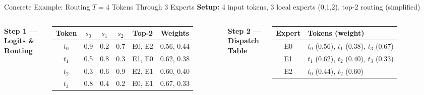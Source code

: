 \begin{frame}{Concrete Example: Routing $T=4$ Tokens Through 3 Experts}
\small
\textbf{Setup:} 4 input tokens, 3 local experts (0,1,2), top-2 routing (simplified)

\medskip
\begin{columns}[T]
\textbf{Step 1 --- Logits \& Routing}
\scriptsize
\begin{tabular}{c|ccc|cc}
\toprule
Token & $s_0$ & $s_1$ & $s_2$ & Top-2 & Weights \\
\midrule
$t_0$ & 0.9 & 0.2 & 0.7 & E0, E2 & 0.56, 0.44 \\
$t_1$ & 0.5 & 0.8 & 0.3 & E1, E0 & 0.62, 0.38 \\
$t_2$ & 0.3 & 0.6 & 0.9 & E2, E1 & 0.60, 0.40 \\
$t_3$ & 0.8 & 0.4 & 0.2 & E0, E1 & 0.67, 0.33 \\
\bottomrule
\end{tabular}

\bigskip
\textbf{Step 2 --- Dispatch Table}\\[2pt]
\scriptsize
\begin{tabular}{c|l}
\toprule
Expert & Tokens (weight) \\
\midrule
E0 & $t_0$ (0.56), $t_1$ (0.38), $t_3$ (0.67) \\
E1 & $t_1$ (0.62), $t_2$ (0.40), $t_3$ (0.33) \\
E2 & $t_0$ (0.44), $t_2$ (0.60) \\
\bottomrule
\end{tabular}


\end{columns}
\end{frame}
